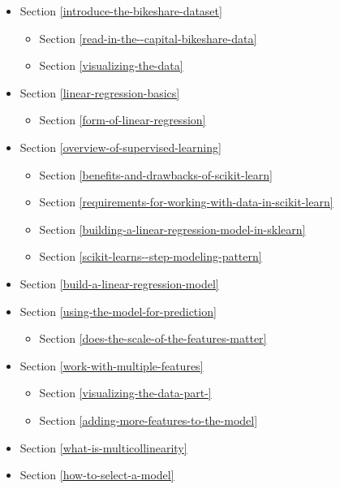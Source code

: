 \documentclass[11pt]{article}
\providecommand{\tightlist}{%
      \setlength{\itemsep}{0pt}\setlength{\parskip}{0pt}}
\begin{document}
\begin{itemize}
\tightlist
\item
  Section \ref{introduce-the-bikeshare-dataset}

  \begin{itemize}
  \tightlist
  \item
    Section \ref{read-in-the--capital-bikeshare-data}
  \item
    Section \ref{visualizing-the-data}
  \end{itemize}
\item
  Section \ref{linear-regression-basics}

  \begin{itemize}
  \tightlist
  \item
    Section \ref{form-of-linear-regression}
  \end{itemize}
\item
  Section \ref{overview-of-supervised-learning}

  \begin{itemize}
  \tightlist
  \item
    Section \ref{benefits-and-drawbacks-of-scikit-learn}
  \item
    Section \ref{requirements-for-working-with-data-in-scikit-learn}
  \item
    Section \ref{building-a-linear-regression-model-in-sklearn}
  \item
    Section \ref{scikit-learns--step-modeling-pattern}
  \end{itemize}
\item
  Section \ref{build-a-linear-regression-model}
\item
  Section \ref{using-the-model-for-prediction}

  \begin{itemize}
  \tightlist
  \item
    Section \ref{does-the-scale-of-the-features-matter}
  \end{itemize}
\item
  Section \ref{work-with-multiple-features}

  \begin{itemize}
  \tightlist
  \item
    Section \ref{visualizing-the-data-part-}
  \item
    Section \ref{adding-more-features-to-the-model}
  \end{itemize}
\item
  Section \ref{what-is-multicollinearity}
\item
  Section \ref{how-to-select-a-model}


\end{itemize}
\end{document}
